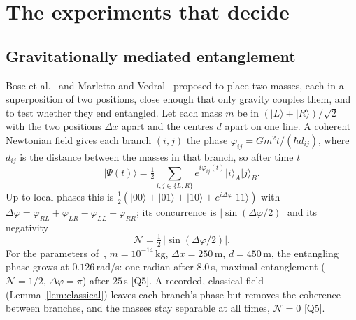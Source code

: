 \documentclass[11pt,a4paper]{article}
\theoremstyle{definition}
\theoremstyle{remark}
\newcommand{\chk}[1]{\textsf{[#1]}}
\newcommand{\ket}[1]{\lvert #1\rangle}
\theoremstyle{definition}
\begin{document}
\section{The experiments that decide}\label{sec:exp}

\subsection{Gravitationally mediated entanglement}

Bose et al.~\cite{bose} and Marletto and Vedral~\cite{mv} proposed to place two masses, each in a superposition of two positions, close
enough that only gravity couples them, and to test whether they end entangled. Let each mass $m$ be in $(\ket L+\ket R)/\sqrt2$ with the two
positions $\Delta x$ apart and the centres $d$ apart on one line. A coherent Newtonian field gives each branch $(i,j)$ the phase
$\varphi_{ij}=Gm^2t/(\hbar d_{ij})$, where $d_{ij}$ is the distance between the masses in that branch, so after time $t$
\begin{equation}\label{eq:bmv}
\ket{\Psi(t)}=\tfrac12\sum_{i,j\in\{L,R\}}e^{i\varphi_{ij}(t)}\ket i_A\ket j_B .
\end{equation}
Up to local phases this is $\tfrac12(\ket{00}+\ket{01}+\ket{10}+e^{i\Delta\varphi}\ket{11})$ with
$\Delta\varphi=\varphi_{RL}+\varphi_{LR}-\varphi_{LL}-\varphi_{RR}$; its concurrence is $|\sin(\Delta\varphi/2)|$ and its negativity
\begin{equation}\label{eq:neg}
\mathcal N=\tfrac12\,|\sin(\Delta\varphi/2)|.
\end{equation}
For the parameters of~\cite{bose}, $m=10^{-14}$\,kg, $\Delta x=250$\,\textmu m, $d=450$\,\textmu m, the entangling phase grows at
$0.126$\,rad/s: one radian after $8.0$\,s, maximal entanglement ($\mathcal N=1/2$, $\Delta\varphi=\pi$) after $25$\,s \chk{Q5}. A recorded,
classical field (Lemma~\ref{lem:classical}) leaves each branch's phase but removes the coherence between branches, and the masses stay
separable at all times, $\mathcal N=0$ \chk{Q5}.
\end{document}
